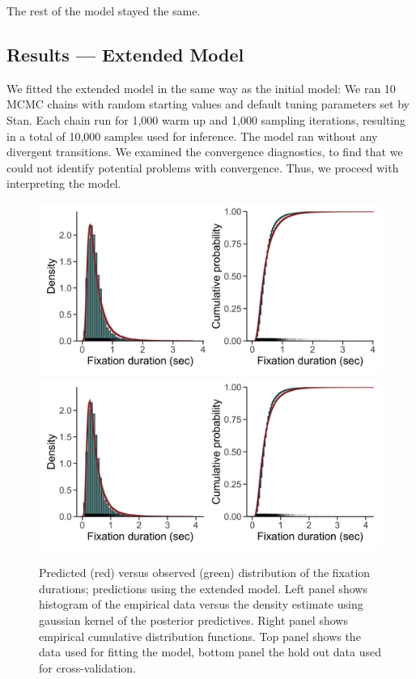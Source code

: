\documentclass{article}
\begin{document}
The rest of the model stayed the same.

\subsection{Results --- Extended Model}

We fitted the extended model in the same way as the initial model: We ran 10 MCMC chains with random starting values and default tuning parameters set by Stan. Each chain run for 1,000 warm up and 1,000 sampling iterations, resulting in a total of 10,000 samples used for inference. The model ran without any divergent transitions. We examined the convergence diagnostics, to find that we could not identify potential problems with convergence. Thus, we proceed with interpreting the model.

\begin{figure}
    \centering
    \includegraphics[width=\textwidth]{figures/fit_model_horizontal/in_sample/fixation_durations.jpg}
    \includegraphics[width=\textwidth]{figures/fit_model_horizontal/out_sample/fixation_durations.jpg}
    \caption{Predicted (red) versus observed (green) distribution of the fixation durations; predictions using the extended model. Left panel shows histogram of the empirical data versus the density estimate using gaussian kernel of the posterior predictives. Right panel shows empirical cumulative distribution functions. Top panel shows the data used for fitting the model, bottom panel the hold out data used for cross-validation.}
    \label{fig:predictives_durations_horizontal}
\end{figure}
\end{document}
